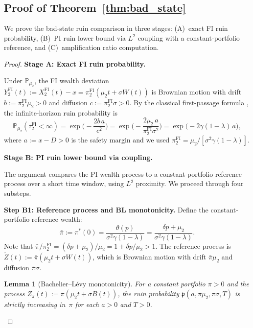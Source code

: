 \documentclass[12pt]{article}
\newtheorem{lemma}[theorem]{Lemma}
\theoremstyle{remark}
\theoremstyle{definition}
\newcommand{\Prob}{\mathbb{P}}
\newcommand{\FI}{\mathrm{FI}}
\begin{document}
\subsection{Proof of Theorem~\ref{thm:bad_state}}\label{sec:proof_bad_state_detail}

We prove the bad-state ruin comparison in three stages:
(A)~exact FI ruin probability,
(B)~PI ruin lower bound via $L^2$ coupling with a constant-portfolio reference,
and (C)~amplification ratio computation.

\begin{proof}
\textbf{Stage A: Exact FI ruin probability.}

Under $\Prob_{\mu_2}$, the FI wealth deviation
$Y_2^{\FI}(t) := X_2^{\FI}(t) - x = \pi_2^{\FI}(\mu_2 t + \sigma W(t))$
is Brownian motion with drift $b := \pi_2^{\FI}\mu_2 > 0$ and diffusion
$c := \pi_2^{\FI}\sigma > 0$.
By the classical first-passage formula
\citep[Proposition~3.5.2]{KaratzasShreve1991}, the infinite-horizon
ruin probability is
\begin{equation}\label{eq:FI_ruin_exact}
  \Prob_{\mu_2}(\tau_2^{\FI} < \infty)
  = \exp\!\biggl(-\frac{2b\,a}{c^2}\biggr)
  = \exp\!\biggl(-\frac{2\mu_2\,a}{\pi_2^{\FI}\sigma^2}\biggr)
  = \exp\!\bigl(-2\gamma(1-\lambda)\,a\bigr),
\end{equation}
where $a := x - D > 0$ is the safety margin and we used
$\pi_2^{\FI} = \mu_2/[\sigma^2\gamma(1-\lambda)]$.

\medskip
\textbf{Stage B: PI ruin lower bound via coupling.}

The argument compares the PI wealth process to a constant-portfolio
reference process over a short time window, using $L^2$ proximity.
We proceed through four substeps.

\medskip\noindent\textbf{Step B1: Reference process and BL monotonicity.}
Define the constant-portfolio reference wealth:
\begin{equation}\label{eq:bar_pi}
  \bar{\pi} := \pi^*(0) = \frac{\theta(p)}{\sigma^2\gamma(1-\lambda)}
  = \frac{\delta p + \mu_2}{\sigma^2\gamma(1-\lambda)}.
\end{equation}
Note that $\bar{\pi}/\pi_2^{\FI} = (\delta p + \mu_2)/\mu_2
= 1 + \delta p/\mu_2 > 1$.
The reference process is
$\widetilde{Z}(t) := \bar{\pi}(\mu_2 t + \sigma W(t))$,
which is Brownian motion with drift $\bar{\pi}\mu_2$ and
diffusion $\bar{\pi}\sigma$.

\begin{lemma}[Bachelier--L\'evy monotonicity]\label{lem:BL_mono}
For a constant portfolio $\pi > 0$ and the process
$Z_\pi(t) := \pi(\mu_2 t + \sigma B(t))$, the ruin probability
$\mathfrak{p}(a, \pi\mu_2, \pi\sigma, T)$
is strictly increasing in~$\pi$ for each $a > 0$ and $T > 0$.
\end{lemma}


\end{proof}
\end{document}
